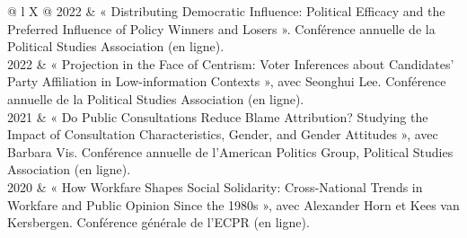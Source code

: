 \documentclass[letterpaper,fontsize=10.5pt]{scrartcl}
\begin{document}
\begin{longtblr}[entry=none,label=none]{@{} l X @{}}
	2022 & « Distributing Democratic Influence: Political Efficacy and the Preferred Influence of Policy Winners and Losers ». Conférence annuelle de la Political Studies Association (en ligne).\\
	2022 & « Projection in the Face of Centrism: Voter Inferences about Candidates’ Party Affiliation in Low-information Contexts », avec Seonghui Lee. Conférence annuelle de la Political Studies Association (en ligne).\\
	2021 & « Do Public Consultations Reduce Blame Attribution? 
	Studying the Impact of Consultation Characteristics, Gender, and Gender Attitudes », avec Barbara Vis. Conférence annuelle de l'American Politics Group, Political Studies Association (en ligne).\\		
	2020 & « How Workfare Shapes Social Solidarity: Cross-National Trends in Workfare and Public Opinion Since the 1980s », avec Alexander Horn et Kees van Kersbergen. Conférence générale de l'ECPR (en ligne).\\

\end{longtblr}
\end{document}
